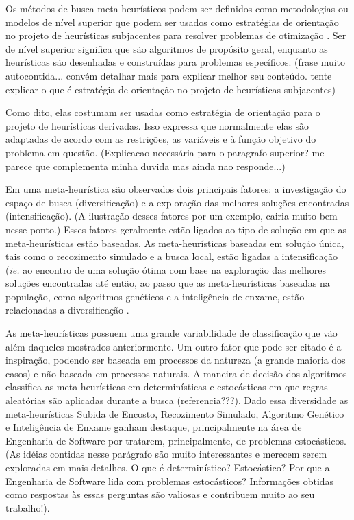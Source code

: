 Os métodos de busca meta-heurísticos podem ser definidos como metodologias ou modelos de nível superior que podem ser usados como estratégias de orientação no projeto de heurísticas subjacentes para resolver problemas de otimização \cite{talbi2009metaheuristics}. Ser de nível superior significa que são algoritmos de propósito geral, enquanto as heurísticas são desenhadas e construídas para  problemas específicos. (frase muito autocontida... convém detalhar mais para explicar melhor seu conteúdo. tente explicar o que é estratégia de orientação no projeto de heurísticas subjacentes)

Como dito, elas costumam ser usadas como estratégia de orientação para o projeto de heurísticas derivadas. Isso expressa que normalmente elas são adaptadas de acordo com as restrições, as variáveis e à função objetivo do problema em questão. (Explicacao necessária para o paragrafo superior? me parece que complementa minha duvida mas ainda nao responde...)

Em uma meta-heurística são observados dois principais fatores: a investigação do espaço de busca (diversificação) e a exploração das melhores soluções encontradas (intensificação). (A ilustração desses fatores por um exemplo, cairia muito bem nesse ponto.) Esses fatores geralmente estão ligados ao tipo de solução em que as meta-heurísticas estão baseadas. As meta-heurísticas baseadas em solução única, tais como o recozimento simulado e a busca local, estão ligadas a intensificação (\textit{ie.} ao encontro de uma solução ótima com base na exploração das melhores soluções encontradas até então, ao passo que as meta-heurísticas baseadas na população, como algoritmos genéticos e a inteligência de enxame, estão relacionadas a diversificação \cite{talbi2009metaheuristics}.

As meta-heurísticas possuem uma grande variabilidade de classificação que vão além daqueles mostrados anteriormente. Um outro fator que pode ser citado é a inspiração, podendo ser baseada em processos da natureza (a grande maioria dos casos) e não-baseada em processos naturais. A maneira de decisão dos algoritmos classifica as meta-heurísticas em determinísticas e estocásticas em que regras aleatórias são aplicadas durante a busca (referencia???). Dado essa diversidade as meta-heurísticas Subida de Encosto, Recozimento Simulado,  Algoritmo Genético e Inteligência de Enxame ganham destaque, principalmente na área de Engenharia de Software \cite{khari2017extensive} por tratarem, principalmente, de problemas estocásticos. (As idéias contidas nesse parágrafo são muito interessantes e merecem serem exploradas em mais detalhes. O que é determinístico? Estocástico?  Por que a Engenharia de Software lida com problemas estocásticos? Informações obtidas como respostas às essas perguntas são valiosas e contribuem muito ao seu trabalho!).



